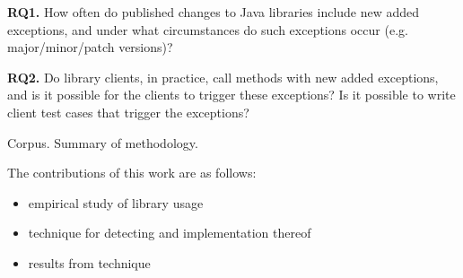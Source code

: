 \noindent
{\bf RQ1.} How often do published changes to Java libraries include new added exceptions,
and under what circumstances do such exceptions occur (e.g. major/minor/patch versions)?

\noindent
{\bf RQ2.} Do library clients, in practice, call methods with new added exceptions, and is it possible for the clients to trigger these exceptions? Is it possible to write client test cases that trigger the exceptions?

\vspace*{1em}

Corpus. Summary of methodology.

The contributions of this work are as follows: 

\begin{itemize}[noitemsep]
\item empirical study of library usage
\item technique for detecting and implementation thereof
  \item results from technique
\end{itemize}



